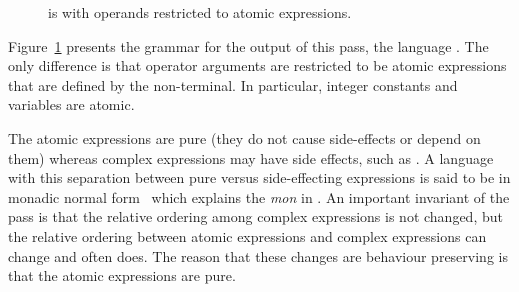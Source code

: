 \documentclass[7x10]{TimesAPriori_MIT}%
\def\racketEd{0}
\def\pythonEd{1}
\def\edition{1}
\begin{document}
\begin{figure}[tp]
\centering
\fbox{
\begin{minipage}{0.96\textwidth}
{\if\edition\racketEd
\[
\begin{array}{rcl}
\Atm &::=& \INT{\Int} \MID \VAR{\Var} \\
\Exp &::=& \Atm \MID \READ{} \\
     &\MID& \NEG{\Atm} \MID \ADD{\Atm}{\Atm}  \\
     &\MID&  \LET{\Var}{\Exp}{\Exp} \\
\LangVarANFM{}  &::=& \PROGRAM{\code{'()}}{\Exp}
\end{array}
\]
\fi}
{\if\edition\pythonEd
\[
\begin{array}{rcl}
\Atm &::=& \INT{\Int} \MID \VAR{\Var} \\  
\Exp{} &::=& \Atm \MID \READ{} \\
       &\MID& \NEG{\Atm} \MID  \ADD{\Atm}{\Atm} \\
\Stmt{} &::=& \PRINT{\Atm} \MID \EXPR{\Exp} \\
        &\MID& \ASSIGN{\VAR{\Var}}{\Exp}\\
\LangVarANFM{}  &::=& \PROGRAM{}{\Stmt^{*}}
\end{array}
\]

\fi}  
\end{minipage}
}
\caption{\LangVarANF{} is \LangVar{} with operands restricted to
  atomic expressions.}
\label{fig:Lvar-anf-syntax}
\end{figure}

Figure~\ref{fig:Lvar-anf-syntax} presents the grammar for the output
of this pass, the language \LangVarANF{}. The only difference is that
operator arguments are restricted to be atomic expressions that are
defined by the \Atm{} non-terminal. In particular, integer constants
and variables are atomic.

The atomic expressions are pure (they do not cause side-effects or
depend on them) whereas complex expressions may have side effects,
such as \READ{}.  A language with this separation between pure versus
side-effecting expressions is said to be in monadic normal
form~\citep{Moggi:1991in,Danvy:2003fk} which explains the \textit{mon}
in \LangVarANF{}. An important invariant of the
 pass is that the relative ordering
among complex expressions is not changed, but the relative ordering
between atomic expressions and complex expressions can change and
often does. The reason that these changes are behaviour preserving is
that the atomic expressions are pure.
\end{document}
